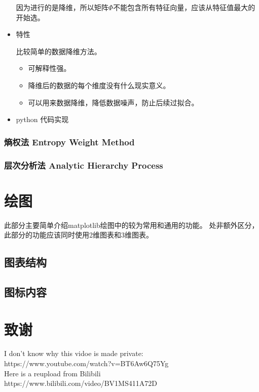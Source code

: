 \documentclass{article}
\begin{document}
\begin{itemize}
因为进行的是降维，所以矩阵$\boldsymbol{\varPhi}$不能包含所有特征向量，应该从特征值最大的开始选。

\item{特性}

比较简单的数据降维方法。

\begin{itemize}
    \item 可解释性强。
    \item 降维后的数据的每个维度没有什么现实意义。
    \item 可以用来数据降维，降低数据噪声，防止后续过拟合。
\end{itemize}

\item{python 代码实现}


\end{itemize}

\subsubsection{熵权法 Entropy Weight Method}

\subsubsection{层次分析法 Analytic Hierarchy Process}


\section{绘图}

此部分主要简单介绍matplotlib绘图中的较为常用和通用的功能。
处非额外区分，此部分的功能应该同时使用2维图表和3维图表。

\subsection{图表结构}

\subsection{图标内容}

\section{致谢}

I don't know why this vidoe is made private:\\
https://www.youtube.com/watch?v=BT6Aw6Q75Yg\\
Here is a reupload from Bilibili\\
https://www.bilibili.com/video/BV1MS411A72D
\end{document}
